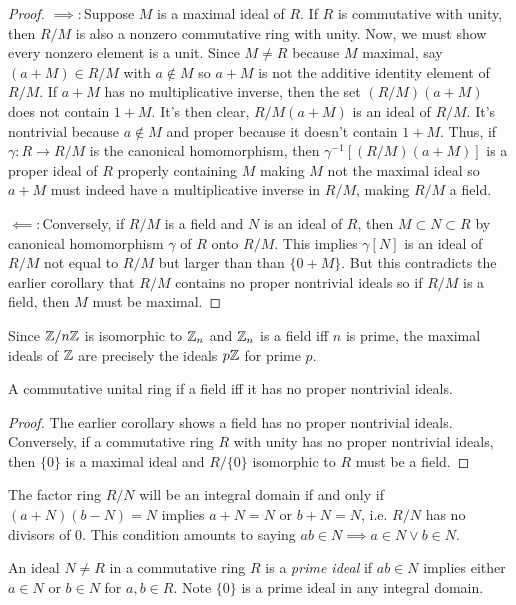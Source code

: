 \begin{proof}
    $\implies\colon$Suppose $M$ is a maximal ideal of $R$. If $R$ is commutative with unity, then $R/M$ is also a nonzero commutative ring with unity. Now, we must show every nonzero element is a unit. Since $M \neq R$ because $M$ maximal, say $(a+M) \in R/M$ with $a \notin M$ so $a+M$ is not the additive identity element of $R/M$. If $a+M$ has no multiplicative inverse, then the set $(R/M)(a+M)$ does not contain $1+M$. It's then clear, $R/M(a+M)$ is an ideal of $R/M$. It's nontrivial because $a \notin M$ and proper because it doesn't contain $1+M$. Thus, if $\gamma\colon R\to R/M$ is the canonical homomorphism, then $\gamma^{-1}[(R/M)(a+M)]$ is a proper ideal of $R$ properly containing $M$ making $M$ not the maximal ideal so $a+M$ must indeed have a multiplicative inverse in $R/M$, making $R/M$ a field.

    $\impliedby\colon$Conversely, if $R/M$ is a field and $N$ is an ideal of $R$, then $M \subset N \subset R$ by canonical homomorphism $\gamma$ of $R$ onto $R/M.$ This implies $\gamma[N]$ is an ideal of $R/M$ not equal to $R/M$ but larger than than $\{0+M\}$. But this contradicts the earlier corollary that $R/M$ contains no proper nontrivial ideals so if $R/M$ is a field, then $M$ must be maximal.
\end{proof}
\begin{example}
    Since $\mathbb{Z}/n\mathbb{Z}$ is isomorphic to $\mathbb{Z}_n$ and $\mathbb{Z}_n$ is a field iff $n$ is prime, the maximal ideals of $\mathbb{Z}$ are precisely the ideals $p\mathbb{Z}$ for prime $p$.
\end{example}
\begin{corollary}
    A commutative unital ring if a field iff it has no proper nontrivial ideals.
\end{corollary}
\begin{proof}
    The earlier corollary shows a field has no proper nontrivial ideals. Conversely, if a commutative ring $R$ with unity has no proper nontrivial ideals, then $\{0\}$ is a maximal ideal and $R/\{0\}$ isomorphic to $R$ must be a field.
\end{proof}
\begin{remark}
    The factor ring $R/N$ will be an integral domain if and only if $(a+N)(b-N) = N$ implies $a+N = N$ or $b+N = N$, i.e. $R/N$ has no divisors of 0. This condition amounts to saying $ab \in N \implies a\in N \vee  b \in N.$
\end{remark}
\begin{definition}
    An ideal $N \neq R$ in a commutative ring $R$ is a \emph{prime ideal} if $ab \in N$ implies either $a\in N$ or $b \in N$ for $a,b \in R$. Note $\{0\}$ is a prime ideal in any integral domain.
\end{definition}
